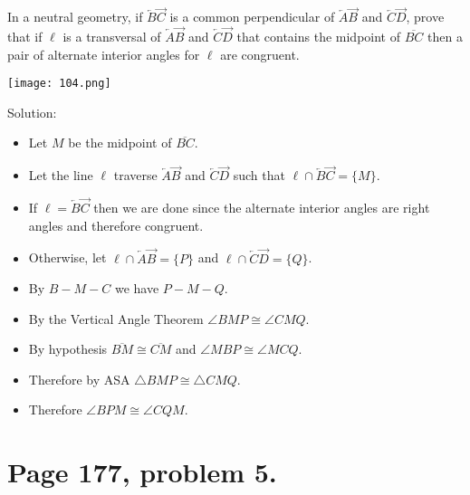 \documentclass[12pt,openany]{report}
\begin{document}
In a neutral geometry, if $\overleftarrow B\overrightarrow C$ is a common
perpendicular of $\overleftarrow A\overrightarrow B$
and $\overleftarrow C\overrightarrow D$, prove
that if $\ell$ is a transversal of $\overleftarrow A\overrightarrow B$
and $\overleftarrow C\overrightarrow D$ that contains the midpoint
of $\overline{BC}$ then a pair of alternate interior angles for $\ell$
are congruent.

\bigskip
\noindent
\texttt{[image: 104.png]}

\bigskip
\noindent
Solution:

\begin{itemize}

\item[]
Let $M$ be the midpoint of $\overline{BC}$.

\item[]
Let the line $\ell$ traverse
$\overleftarrow A\overrightarrow B$
and
$\overleftarrow C\overrightarrow D$
such that $\ell\cap\overleftarrow B\overrightarrow C=\{M\}$.

\item[]
If $\ell=\overleftarrow B\overrightarrow C$ then we are done
since the alternate interior angles are right angles
and therefore congruent.

\item[]
Otherwise, let $\ell\cap\overleftarrow A\overrightarrow B=\{P\}$ and
$\ell\cap\overleftarrow C\overrightarrow D=\{Q\}$.

\item[]
By $B{-}M{-}C$ we have $P{-}M{-}Q$.

\item[]
By the Vertical Angle Theorem $\angle BMP\cong\angle CMQ$.

\item[]
By hypothesis $\overline{BM}\cong\overline{CM}$ and $\angle MBP\cong\angle MCQ$.

\item[]
Therefore by ASA $\triangle BMP\cong\triangle CMQ$.

\item[]
Therefore $\angle BPM\cong\angle CQM$.

\end{itemize}

\newpage

\section*{Page 177, problem 5.}
\end{document}
